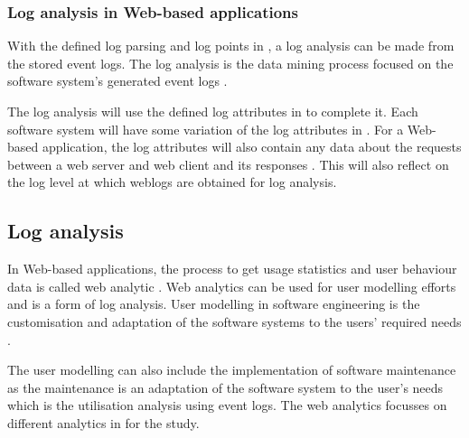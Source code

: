 \subsubsection{Log analysis in Web-based applications}
With the defined log parsing and log points in , a log analysis can be made from the stored event logs. The log analysis is the data mining process focused on the software system's generated event logs \cite{Slaninova2014,Hasiloglu2018}.\par The log analysis will use the defined log attributes in  to complete it. Each software system will have some variation of the log attributes in . For a Web-based application, the log attributes will also contain any data about the requests between a web server and web client and its responses \cite{Slaninova2014, Dhanalakshmi2016}. This will also reflect on the log level at which weblogs are obtained for log analysis.


\subsection{Log analysis}\label{sec:ch1_systemUtilisation}
In Web-based applications, the process to get usage statistics and user behaviour data is called web analytic \cite{Kocsis2012}. Web analytics can be used for user modelling efforts and is a form of log analysis. User modelling in software engineering is the customisation and adaptation of the software systems to the users' required needs \cite{Waqar2017, Paliouras1999}.\par The user modelling can also include the implementation of software maintenance as the maintenance is an adaptation of the software system to the user's needs which is the utilisation analysis using event logs. The web analytics focusses on different analytics in  for the study. 

